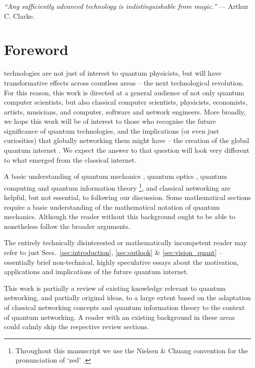 %
%

\textit{``Any sufficiently advanced technology is indistinguishable from magic."} --- Arthur C. Clarke.

\section{Foreword}\label{sec:foreword}

 technologies are not just of interest to quantum physicists, but will have transformative effects across countless areas -- the next technological revolution. For this reason, this work is directed at a general audience of not only quantum computer scientists, but also classical computer scientists, physicists, economists, artists, musicians, and computer, software and network engineers. More broadly, we hope this work will be of interest to those who recognise the future significance of quantum technologies, and the implications (or even just curiosities) that globally networking them might have -- the creation of the global quantum internet \cite{bib:Kimble2008}. We expect the answer to that question will look very different to what emerged from the classical internet.

A basic understanding of quantum mechanics \cite{bib:Sakurai94}, quantum optics \cite{bib:GerryKnight05}, quantum computing and quantum information theory \cite{bib:NielsenChuang00}\footnote{Throughout this manuscript we use the Nielsen \& Chuang convention for the pronunciation of `zed' \cite{bib:NielsenChuang00}.}, and classical networking \cite{bib:TanenbaumNet} are helpful, but not essential, to following our discussion. Some mathematical sections require a basic understanding of the mathematical notation of quantum mechanics. Although the reader without this background ought to be able to nonetheless follow the broader arguments.

The entirely technically disinterested or mathematically incompetent reader may refer to just Secs.~\ref{sec:introduction}, \ref{sec:outlook} \& \ref{sec:vision_quant} -- essentially brief non-technical, highly speculative essays about the motivation, applications and implications of the future quantum internet.

This work is partially a review of existing knowledge relevant to quantum networking, and partially original ideas, to a large extent based on the adaptation of classical networking concepts and quantum information theory to the context of quantum networking. A reader with an existing background in these areas could calmly skip the respective review sections.

